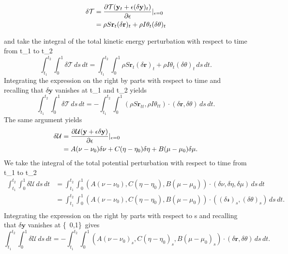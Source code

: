 \documentclass[12pt]{article}
\newcommand{\cB}{B}
\newcommand{\cA}{A}
\newcommand{\cC}{C}
\begin{document}
\begin{equation}
\begin{split}
 \delta\mathcal{T}& = \frac{\partial \mathcal{T}(\mathbf{y}_t + \epsilon (\delta \mathbf{y})_t )}{\partial{\epsilon}} \arrowvert_{\epsilon=0}\\
                  & = \rho S\mathbf{r}_t (\delta\mathbf{r})_t + \rho I \theta_t (\delta \theta)_t\\
\end{split}
\end{equation}

and take the integral of the total kinetic energy perturbation with respect to time from t_1 to t_2
\[\int_{t_1}^{t_2} \int_{0}^{1} \delta \mathcal{T}\, ds \, dt = \int_{t_1}^{t_2} \int_{0}^{1} \rho S\mathbf{r}_t (\delta\mathbf{r})_t + \rho I \theta_t (\delta \theta)_t\, ds \, dt.
\]
Integrating the expression on the right by parts with respect to time and recalling that $\delta\mathbf{y}$ vanishes at t_1 and t_2  yields
\[\int_{t_1}^{t_2}\int_{0}^{1}\delta \mathcal{T}\,ds\,dt = -\int_{t_1}^{t_2}\int_{0}^{1}(\rho S\mathbf{r}_{tt}, \rho I\theta_{tt})\cdot(\delta\mathbf{r},\delta\theta)\,ds\,dt.
\]
The same argument yields
\begin{equation}
\begin{split}
 \delta\mathcal{U}& = \frac{\partial \mathcal{U}(\mathbf{y} + \epsilon\delta\mathbf{y})}{\partial{\epsilon}} \arrowvert_{\epsilon=0}\\
                  & = \cA(\nu-\nu_{0})\delta\nu+\cC(\eta-\eta_0)\delta\eta+\cB(\mu-\mu_0)\delta\mu.\\
\end{split}
\end{equation}
We take the integral of the total potential perturbation with respect to time from t_1 to t_2
\begin{equation}
\begin{split}
\int_{t_1}^{t_2}\int_{0}^{1}\delta\mathcal{U}\,ds\,dt 
                  & = \int_{t_1}^{t_2} \int_{0}^{1} 
(\cA(\nu-\nu_{0}),\cC(\eta-\eta_0),\cB(\mu-\mu_0))\cdot(\delta\nu,\delta\eta,\delta\mu)\,ds\,dt\\
                  & = \int_{t_1}^{t_2} \int_{0}^{1} 
(\cA(\nu-\nu_{0}),\cC(\eta-\eta_0),\cB(\mu-\mu_0))\cdot((\delta \mathcal{r})_s,(\delta\theta)_s)\,ds\,dt.\\
\end{split}
\end{equation}
Integrating the expression on the right by parts with respect to s and recalling that $\delta\mathbf{y}$ vanishes at \{\ 0,1\}\ gives
\[\int_{t_1}^{t_2}\int_{0}^{1}\delta\mathcal{U}\,ds\,dt =
-\int_{t_1}^{t_2} \int_{0}^{1} 
(\cA(\nu-\nu_{0})_s,\cC(\eta-\eta_0)_s,\cB(\mu-\mu_0)_s)\cdot(\delta\mathbf{r},\delta\theta)\,ds\,dt.
\]
\end{document}
